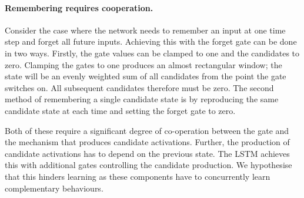 \paragraph{Remembering requires cooperation.}
Consider the case where the network needs to remember an input at one time step and forget all future
inputs. Achieving this with the forget gate can be done in two
ways. Firstly, the gate values can be clamped to one and the
candidates to zero. Clamping the gates to one produces an almost rectangular window; the state will be an
evenly weighted sum of all candidates from the point the gate switches on. All subsequent candidates
therefore must be zero.
The second method of remembering a single candidate state is by reproducing the same candidate
state at each time and setting the forget gate to zero.

Both of these require a significant degree of co-operation between the gate and the mechanism that
produces candidate activations. Further, the production of candidate activations has to
depend on the previous state. The LSTM achieves this with additional gates controlling the candidate
production. We hypothesise that this hinders learning as these components have to concurrently learn
complementary behaviours.

%


